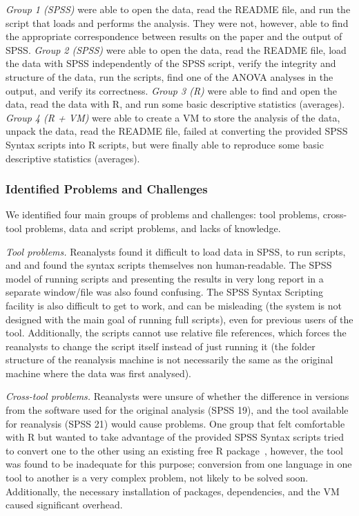 \emph{Group 1 (SPSS)} were able to open the data, read the README file, and run the script that loads and performs the analysis. They were not, however, able to find the appropriate correspondence between results on the paper and the output of SPSS. 
\emph{Group 2 (SPSS)} were able to open the data, read the README file, load the data with SPSS independently of the SPSS script, verify the integrity and structure of the data, run the scripts, find one of the ANOVA analyses in the output, and verify its correctness.
\emph{Group 3 (R)} were able to find and open the data, read the data with R, and run some basic descriptive statistics (averages).
\emph{Group 4 (R + VM)} were able to create a VM to store the analysis of the data, unpack the data, read the README file, failed at converting the provided SPSS Syntax scripts into R scripts, but were finally able to reproduce some basic descriptive statistics (averages).

\subsubsection{Identified Problems and Challenges}
We identified four main groups of problems and challenges: tool problems, cross-tool problems, data and script problems, and lacks of knowledge.

\emph{Tool problems.} Reanalysts found it difficult to load data in SPSS, to run scripts, and and found the syntax scripts themselves non human-readable. The SPSS model of running scripts and presenting the results in very long report in a separate window/file was also found confusing. The SPSS Syntax Scripting facility is also difficult to get to work, and can be misleading (the system is not designed with the main goal of running full scripts), even for previous users of the tool. Additionally, the scripts cannot use relative file references, which forces the reanalysts to change the script itself instead of just running it (the folder structure of the reanalysis machine is not necessarily the same as the original machine where the data was first analysed). 

\emph{Cross-tool problems.} Reanalysts were unsure of whether the difference in
versions from the software used for the original analysis (SPSS 19), and the
tool available for reanalysis (SPSS 21) would cause problems. One group that
felt comfortable with R but wanted to take advantage of the provided SPSS Syntax
scripts tried to convert one to the other using an existing free
R package~\cite{spsstor}, however, the tool was found to be inadequate for this purpose; conversion from one language in one tool to another is a very complex problem, not likely to be solved soon. Additionally, the necessary installation of packages, dependencies, and the VM caused significant overhead.


